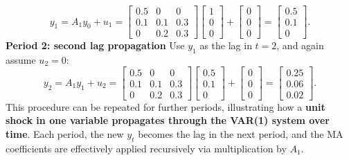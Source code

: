\documentclass[a4paper, 12pt]{article}
\begin{document}
\[
y_1 = A_1 y_0 + u_1
=
\begin{bmatrix}
0.5 & 0 & 0 \\
0.1 & 0.1 & 0.3 \\
0 & 0.2 & 0.3
\end{bmatrix}
\begin{bmatrix}1 \\ 0 \\ 0\end{bmatrix}
+
\begin{bmatrix}0 \\ 0 \\ 0\end{bmatrix}
=
\begin{bmatrix}0.5 \\ 0.1 \\ 0\end{bmatrix}.
\]
\textbf{Period 2: second lag propagation}  
Use $y_1$ as the lag in $t=2$, and again assume $u_2 = 0$:
\[
y_2 = A_1 y_1 + u_2
=
\begin{bmatrix}
0.5 & 0 & 0 \\
0.1 & 0.1 & 0.3 \\
0 & 0.2 & 0.3
\end{bmatrix}
\begin{bmatrix}0.5 \\ 0.1 \\ 0\end{bmatrix}
+
\begin{bmatrix}0 \\ 0 \\ 0\end{bmatrix}
=
\begin{bmatrix}0.25 \\ 0.06 \\ 0.02\end{bmatrix}.
\]
This procedure can be repeated for further periods, illustrating how a \textbf{unit shock in one variable propagates through the VAR(1) system over time}.  
Each period, the new $y_t$ becomes the lag in the next period, and the MA coefficients are effectively applied recursively via multiplication by $A_1$.
\end{document}
